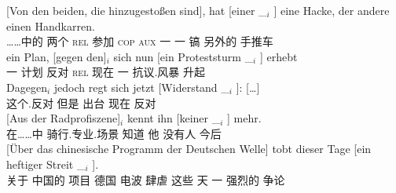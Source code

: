 \begin{sloppypar}
\ex 
\gll {}[Von den beiden, die hinzugestoßen sind], hat [einer        \_$_i$ ] eine Hacke, der andere einen Handkarren.\footnotemark\\
	 {}\spacebr{}……中的  两个 \textsc{rel} 参加 \textsc{cop} \textsc{aux} \spacebr{}一 {}    {}  一 镐    另外的  手推车\\
\ex 
\gll ein Plan, [gegen den]$_i$ sich nun [ein Proteststurm \_$_i$ ] erhebt\footnotemark\\
     一 计划 \spacebr{}反对 \textsc{rel}  现在 \spacebr{}一 抗议.风暴 {} {} 升起\\
\ex 
\gll {}Dagegen$_i$ jedoch regt sich jetzt [Widerstand \_$_i$ ]: [\ldots]\footnotemark\\
	{}这个.反对 但是 出台  现在 \spacebr{}反对 {}\\
\ex
\gll {}[Aus der Radprofiszene]$_i$ kennt ihn [keiner \_$_i$ ] mehr.\footnotemark\\
	 {}\spacebr{}在……中  骑行.专业.场景 知道 他 \spacebr{}没有人 {} {} 今后\\
\ex 
\gll {}[Über das chinesische Programm der Deutschen Welle] tobt dieser Tage [ein heftiger Streit \_$_i$ ].\footnotemark\\
     \spacebr{}关于  中国的 项目  德国 电波 肆虐 这些 天 \spacebr{}一 强烈的 争论\\
\zl
\end{sloppypar}

